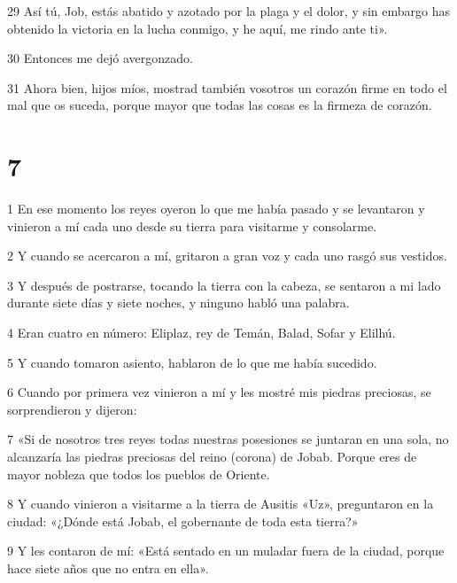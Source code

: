 \par 29 Así tú, Job, estás abatido y azotado por la plaga y el dolor, y sin embargo has obtenido la victoria en la lucha conmigo, y he aquí, me rindo ante ti».

\par 30 Entonces me dejó avergonzado.

\par 31 Ahora bien, hijos míos, mostrad también vosotros un corazón firme en todo el mal que os suceda, porque mayor que todas las cosas es la firmeza de corazón.

\chapter{7}

\par 1 En ese momento los reyes oyeron lo que me había pasado y se levantaron y vinieron a mí cada uno desde su tierra para visitarme y consolarme.

\par 2 Y cuando se acercaron a mí, gritaron a gran voz y cada uno rasgó sus vestidos.

\par 3 Y después de postrarse, tocando la tierra con la cabeza, se sentaron a mi lado durante siete días y siete noches, y ninguno habló una palabra.

\par 4 Eran cuatro en número: Eliplaz, rey de Temán, Balad, Sofar y Elilhú.

\par 5 Y cuando tomaron asiento, hablaron de lo que me había sucedido.

\par 6 Cuando por primera vez vinieron a mí y les mostré mis piedras preciosas, se sorprendieron y dijeron:

\par 7 «Si de nosotros tres reyes todas nuestras posesiones se juntaran en una sola, no alcanzaría las piedras preciosas del reino (corona) de Jobab. Porque eres de mayor nobleza que todos los pueblos de Oriente.

\par 8 Y cuando vinieron a visitarme a la tierra de Ausitis «Uz», preguntaron en la ciudad: «¿Dónde está Jobab, el gobernante de toda esta tierra?»

\par 9 Y les contaron de mí: «Está sentado en un muladar fuera de la ciudad, porque hace siete años que no entra en ella».

